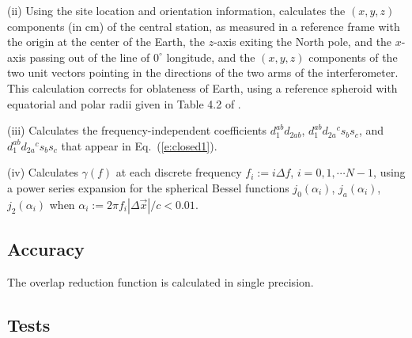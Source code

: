 \documentclass{article}
\begin{document}
(ii) Using the site location and orientation information, calculates the 
$(x,y,z)$ components (in cm) of the central station, as measured in a
reference frame with the origin at the center of the Earth, the
$z$-axis exiting the North pole, and the $x$-axis passing out of the
line of $0^\circ$ longitude, and the $(x,y,z)$ components of the two
unit vectors pointing in the directions of the two arms of the 
interferometer.
This calculation corrects for oblateness of Earth, using a reference
spheroid with equatorial and polar radii given in Table 4.2 of 
\cite{oblate}.

(iii) Calculates the frequency-independent coefficients 
$d_1^{ab}d_{2ab}$, $d_1^{ab}d_{2a}{}^c s_b s_c$, and 
$d_1^{ab}d_{2a}{}^c s_b s_c$ that appear in Eq.~(\ref{e:closed1}).

(iv) Calculates $\gamma(f)$ at each discrete frequency $f_i:=i\Delta f$,
$i=0,1,\cdots N-1$, using a power series expansion for the spherical 
Bessel functions $j_0(\alpha_i)$, $j_a(\alpha_i)$, $j_2(\alpha_i)$ when
$\alpha_i:=2\pi f_i |\Delta\vec x|/c<0.01$.

\subsection{Accuracy}

The overlap reduction function is calculated in single precision.

\subsection{Tests}
\end{document}
